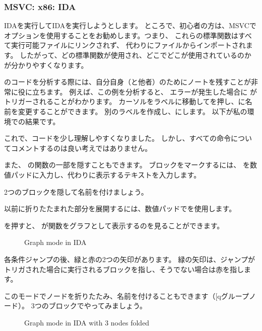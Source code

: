 \subsubsection{MSVC: x86: IDA}

IDAを実行してIDAを実行しようとします。 
ところで、初心者の方は、MSVCでオプションを使用することをお勧めします。つまり、
これらの標準関数はすべて実行可能ファイルにリンクされず、
代わりにファイルからインポートされます。 
したがって、どの標準関数が使用され、どこでどこが使用されているのかが分かりやすくなります。

\IDA のコードを分析する際には、自分自身（と他者）のためにノートを残すことが非常に役に立ちます。 
例えば、この例を分析すると、
エラーが発生した場合に \JNZ がトリガーされることがわかります。 
カーソルをラベルに移動してを押し、に名前を変更することができます。 
別のラベルを作成し、にします。 
以下が私の環境での結果です。



これで、コードを少し理解しやすくなりました。 
しかし、すべての命令についてコメントするのは良い考えではありません。

また、 \IDA の関数の一部を隠すこともできます。 
ブロックをマークするには、 \q{--} を数値パッドに入力し、代わりに表示するテキストを入力します。

2つのブロックを隠して名前を付けましょう。



以前に折りたたまれた部分を展開するには、数値パッドで\q{+}を使用します。

\clearpage
{}を押すと、 \IDA が関数をグラフとして表示するのを見ることができます。

\begin{figure}[H]
\centering
{}
\caption{Graph mode in IDA}
\label{fig:ex3_IDA_1}
\end{figure}

各条件ジャンプの後、緑と赤の2つの矢印があります。 
緑の矢印は、ジャンプがトリガされた場合に実行されるブロックを指し、そうでない場合は赤を指します。

\clearpage
このモードでノードを折りたたみ、名前を付けることもできます（[q{グループノード}）。
3つのブロックでやってみましょう。

\begin{figure}[H]
\centering
{}
\caption{Graph mode in IDA with 3 nodes folded}
\label{fig:ex3_IDA_2}
\end{figure}

